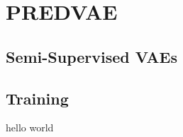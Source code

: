 \section{PREDVAE}
\label{sec:methods}

\subsection{Semi-Supervised VAEs}
\label{sec:ssvae}

\subsection{Training}
\label{sec:training}

hello world